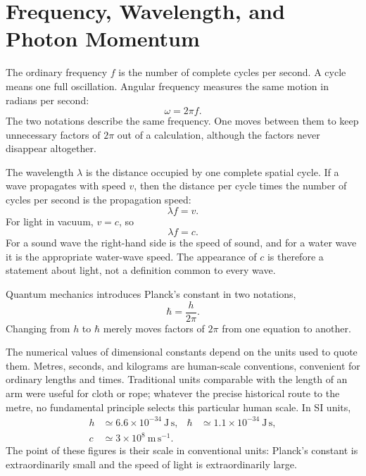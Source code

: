 \section{Frequency, Wavelength, and Photon Momentum}

The ordinary frequency \(f\) is the number of complete cycles per second. A cycle means one full oscillation. Angular frequency measures the same motion in radians per second:
\begin{equation}
\omega=2\pi f.
\end{equation}
The two notations describe the same frequency. One moves between them to keep unnecessary factors of \(2\pi\) out of a calculation, although the factors never disappear altogether.

The wavelength \(\lambda\) is the distance occupied by one complete spatial cycle. If a wave propagates with speed \(v\), then the distance per cycle times the number of cycles per second is the propagation speed:
\begin{equation}
\lambda f=v.
\end{equation}
For light in vacuum, \(v=c\), so
\begin{equation}
\lambda f=c.
\end{equation}
For a sound wave the right-hand side is the speed of sound, and for a water wave it is the appropriate water-wave speed. The appearance of \(c\) is therefore a statement about light, not a definition common to every wave.

Quantum mechanics introduces Planck's constant in two notations,
\begin{equation}
\hbar=\frac{h}{2\pi}.
\end{equation}
Changing from \(h\) to \(\hbar\) merely moves factors of \(2\pi\) from one equation to another.

The numerical values of dimensional constants depend on the units used to quote them. Metres, seconds, and kilograms are human-scale conventions, convenient for ordinary lengths and times. Traditional units comparable with the length of an arm were useful for cloth or rope; whatever the precise historical route to the metre, no fundamental principle selects this particular human scale. In SI units,
\begin{equation}
\begin{aligned}
h &\simeq 6.6\times10^{-34}\ \mathrm{J\,s},
&\hbar &\simeq 1.1\times10^{-34}\ \mathrm{J\,s},\\
c &\simeq 3\times10^8\ \mathrm{m\,s^{-1}}.
\end{aligned}
\end{equation}
The point of these figures is their scale in conventional units: Planck's constant is extraordinarily small and the speed of light is extraordinarily large.

